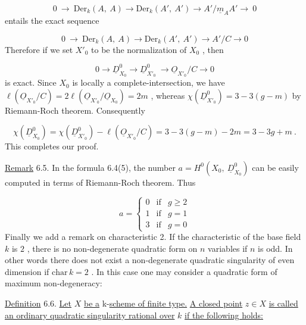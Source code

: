 \begin{equation*}
0 \ \rightarrow\ \mathrm{Der}_k(A,\ A) \rightarrow \mathrm{Der}_k(A',\ A') \rightarrow A'/\underline{m}_A A' \rightarrow\ 0
\end{equation*}
entails the exact sequence

\begin{equation*}
0 \ \rightarrow\ \mathrm{Der}_k(A,\ A) \rightarrow \mathrm{Der}_k(A',\ A') \rightarrow A'/C \rightarrow 0
\end{equation*}
Therefore if we set  $X'_0$  to be the normalization of  $X_0$ , then

\begin{equation*}
0 \rightarrow \underline{D}^0_{X_0} \rightarrow \underline{D}^0_{X'_0}\ \rightarrow \underline{O}_{X'_0}/C \rightarrow 0
\end{equation*}
is exact. Since  $X_0$  is locally a complete-intersection, we have  $\ell(\underline{O}_{X'_0}/C) = 2\ell(\underline{O}_{X'_0}/\underline{O}_{X_0}) = 2m$ , whereas  $\chi(\underline{D}^0_{X'_0}) = 3 - 3(g-m)$  by Riemann-Roch theorem. Consequently

\begin{equation*}
\chi(\underline{D}^0_{X_0}) = \chi(\underline{D}^0_{X'_0}) - \ell(\underline{O}_{X'_0}/C) = 3 - 3(g-m) - 2m = 3 - 3g + m \ .
\end{equation*}
This completes our proof.

\underline{Remark} 6.5.  In the formula 6.4(5), the number  $a = H^0(X_0,\ \underline{D}^0_{X_0})$  can be easily computed in terms of Riemann-Roch theorem. Thus

\begin{equation*}
a = \left\{ \begin{array}{lll} 0 & \text{if} & g \geq 2 \\[4pt] 1 & \text{if} & g = 1 \\[4pt] 3 & \text{if} & g = 0 \end{array} \right.
\end{equation*}
Finally we add a remark on characteristic 2. If the characteristic of the base field  $k$  is  $2$ , there is no non-degenerate quadratic form on  $n$  variables if  $n$  is odd. In other words there does not exist a non-degenerate quadratic singularity of even dimension if  $\mathrm{char}\, k = 2$ . In this case one may consider a quadratic form of maximum non-degeneracy: 



\underline{Definition} 6.6.  \underline{Let}  $X$  \underline{be a} k-\underline{scheme of finite type.} \underline{A closed point}  $z \in X$  \underline{is called an ordinary quadratic singularity rational over}  $k$  \underline{if the following holds:}


